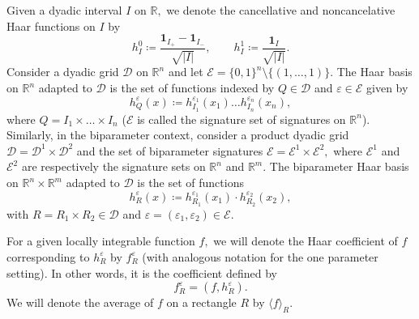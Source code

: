 \documentclass{article}
\theoremstyle{definition}
\theoremstyle{remark}
\numberwithin{equation}{section}
\newcommand{\cD}{\mathcal{D}}
\newcommand{\cE}{\mathcal{E}}
\newcommand{\bfD}{\bm{\mathcal{D}}}
\newcommand{\e}{\varepsilon}
\newcommand{\reals}{\mathbb{R}}
\newcommand{\1}{\mathbf{1}}
\begin{document}
    Given a dyadic interval $I$ on $\reals,$ we denote the cancellative and noncancelative Haar functions on $I$ by
    \begin{equation*}
        h^{0}_{I}\coloneq \frac{\1_{I_{+}}-\1_{I_{-}}}{\sqrt{|I|}},\qquad h^{1}_{I}\coloneq \frac{\1_{I}}{\sqrt{|I|}}.
    \end{equation*}
    Consider a dyadic grid $\cD$ on $\reals^n$ and let $\cE = \{0,1\}^n \setminus \{(1,\ldots,1)\}.$
    The Haar basis on $\reals^n$ adapted to $\cD$ is the set of functions indexed by $Q \in \cD$ and $\e \in \cE$ given by
    \begin{equation*}
        h^{\e}_{Q}(x) \coloneq  h^{\e_1}_{I_1}(x_1) \dots h^{\e_n}_{I_n}(x_n),
    \end{equation*}
    where $Q = I_1 \times \dots \times I_n$ ($\cE$ is called the signature set of signatures on $\reals^n$).
    Similarly, in the biparameter context, consider a product dyadic grid $\bfD = \cD^1 \times \cD^2$ and
    the set of biparameter signatures $\cE = \cE^1 \times \cE^2,$ where $\cE^1$ and $\cE^2$ are respectively the signature sets on $\reals^n$ and $\reals^m.$
    The biparameter Haar basis on $\reals^{n} \times \reals^m$ adapted to $\bfD$ is the set of functions
    \begin{equation*}
        h^{\e}_{R}(x) \coloneq  h^{\e_1}_{R_1}(x_1) \cdot h^{\e_2}_{R_2}(x_2),
    \end{equation*}
    with $R = R_1 \times R_2 \in \bfD$ and $\e = (\e_1,\e_2) \in \cE.$

    For a given locally integrable function $f,$ we will denote the Haar coefficient of $f$ corresponding to $h^{\e}_{R}$ by $f^{\e}_R$
    (with analogous notation for the one parameter setting).
    In other words, it is the coefficient defined by
    \begin{equation}
        \label{eq:HaarCoefDef}
        f^{\e}_R =  (f, h^{\e}_{R}).
    \end{equation}
    We will denote the average of $f$ on a rectangle $R$ by $\langle f \rangle_R.$


\end{document}
